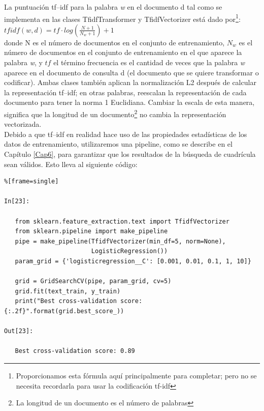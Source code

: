 La puntuación  tf–idf   para la palabra \emph{w} en el documento  d
tal como se implementa en las clases {\ttfamily TfidfTransformer}  y  {\ttfamily TfidfVectorizer}   está dado por{\footnote{\scriptsize{Proporcionamos esta fórmula aquí principalmente para completar; pero no se necesita recordarla para usar la codificación tf-idf}}}:\\
 

 $ tfidf(w, d)  = tf \cdot log(\frac{N+1}{N_{w} + 1}) +1  $\\

\noindent donde N es el número de documentos en el conjunto de entrenamiento, $ N_{w} $ es el número de documentos en el conjunto de entrenamiento en el que aparece la palabra \emph{w}, y $tf$  el término frecuencia   es el cantidad de veces que la palabra \emph{w} aparece en el documento de consulta d (el documento que se quiere transformar o codificar).    
Ambas clases también aplican la normalización L2 después de calcular la representación  tf–idf; 
en otras palabras, reescalan la representación de cada documento para tener la norma 1 Euclidiana. 
Cambiar la escala de esta manera, significa que  la longitud de un documento{\footnote{\scriptsize{ La longitud de un documento es el número de palabras}}} no cambia la representación vectorizada.\\


Debido a que tf–idf en realidad hace uso de las propiedades estadísticas de los datos de entrenamiento,
utilizaremos  una  pipeline, como se describe en el Capítulo \ref{Cap6}, para garantizar que los resultados de la  búsqueda de cuadrícula sean  válidos. Esto lleva al siguiente código:

\begin{lstlisting}%[frame=single]

In[23]:

   from sklearn.feature_extraction.text import TfidfVectorizer
   from sklearn.pipeline import make_pipeline
   pipe = make_pipeline(TfidfVectorizer(min_df=5, norm=None),
                        LogisticRegression())                        
   param_grid = {'logisticregression__C': [0.001, 0.01, 0.1, 1, 10]}
   
   grid = GridSearchCV(pipe, param_grid, cv=5)
   grid.fit(text_train, y_train)
   print("Best cross-validation score: {:.2f}".format(grid.best_score_))

Out[23]:

   Best cross-validation score: 0.89

\end{lstlisting}


